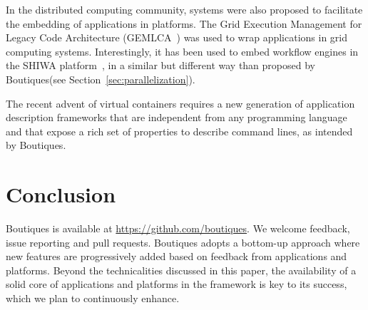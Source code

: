 \documentclass{article}
\newcommand{\boutiques}{Boutiques\xspace}
\begin{document}
In the distributed computing community, systems were also proposed to
facilitate the embedding of applications in platforms. The Grid
Execution Management for Legacy Code Architecture
(GEMLCA~\cite{delaitre2005gemlca}) was used to wrap applications in
grid computing systems. Interestingly, it has been used to embed
workflow engines in the SHIWA
platform~\cite{terstyanszky2014enabling}, in a similar but different
way than proposed by \boutiques (see Section~\ref{sec:parallelization}).

The recent advent of virtual containers requires a new generation of
application description frameworks that are independent from any
programming language and that expose a rich set of properties to
describe command lines, as intended by \boutiques.

\section{Conclusion}

\boutiques is available at \url{https://github.com/boutiques}. We
welcome feedback, issue reporting and pull requests. \boutiques adopts
a bottom-up approach where new features are progressively added based
on feedback from applications and platforms. Beyond the technicalities
discussed in this paper, the availability of a solid core of
applications and platforms in the framework is key to its success,
which we plan to continuously enhance.



\end{document}
